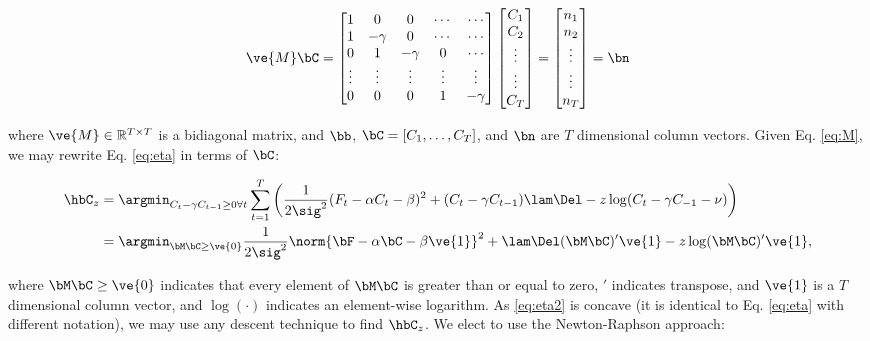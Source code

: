 \documentclass[12pt]{article}
\newcommand{\zzz}{z}
\newcommand{\az}{\argmin_{\bM \bC \geq \ve{0}}}
\begin{document}
\begin{align} \label{eq:M}
\ve{M} \bC = %
\begin{bmatrix}
1 & 0  & 0 & \cdots & \cdots \\
1 & -\gamma & 0 & \cdots & \cdots \\
0 & 1 & -\gamma & 0 & \cdots  \\
\vdots & \vdots & \vdots & \vdots & \vdots  \\
0 & 0 & 0 & 1 & -\gamma
\end{bmatrix}
\begin{bmatrix}
C_1 \\ C_2 \\ \vdots \\ \vdots \\ C_T  
\end{bmatrix}
= 
\begin{bmatrix}
n_1 \\ n_2 \\ \vdots \\ \vdots \\ n_T
\end{bmatrix}
= \bn
\end{align}

\noindent where $\ve{M} \in \mathbb{R}^{T \times T}$ is a bidiagonal matrix,  and $\bb$, $\bC=[C_1,\ldots, C_T]$, and $\bn$ are $T$ dimensional column vectors. Given Eq. \eqref{eq:M}, we may rewrite Eq. \eqref{eq:eta} in terms of $\bC$:

\begin{align} 
\hbC_{\zzz} &= \argmin_{C_t - \gamma C_{t-1} \geq 0 \forall t} \sum_{t=1}^{T} \left( \frac{1}{2 \sig^2}(F_t - \alpha C_t - \beta)^2  + (C_t - \gamma C_{t-1}) \lam \Del - \zzz \log(C_t - \gamma C_{-1} -\nu ) \right) \nonumber \\
&= \az  \frac{1}{2 \sig^2} \norm{\bF - \alpha \bC -\beta \ve{1} }^2 + \lam \Del (\bM \bC )' \ve{1}  - \zzz \log(\bM \bC)'\ve{1},  \label{eq:eta2}
\end{align}

\noindent where $\bM \bC \geq \ve{0}$ indicates that every element of $\bM \bC$ is greater than or equal to zero, $'$ indicates transpose, and  $\ve{1}$ is a $T$ dimensional column vector, and $\log(\cdot)$ indicates an element-wise logarithm.  As \eqref{eq:eta2} is concave (it is identical to Eq. \eqref{eq:eta} with different notation), we may use any descent technique to find $\hbC_{\zzz}$.  We elect to use the Newton-Raphson approach: 
\end{document}
